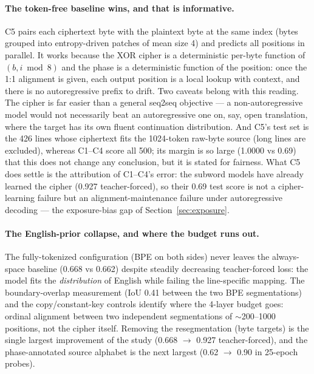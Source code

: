 \documentclass[11pt]{article}
\begin{document}
\paragraph{The token-free baseline wins, and that is informative.}
C5 pairs each ciphertext byte with the plaintext byte at the same index (bytes
grouped into entropy-driven patches of mean size 4) and predicts all positions
in parallel. It works because the XOR cipher is a deterministic per-byte
function of $(b, i \bmod 8)$ and the phase is a deterministic function of the
position: once the 1:1 alignment is given, each output position is a local
lookup with context, and there is no autoregressive prefix to drift. Two caveats belong with this reading. The cipher is far easier
than a general seq2seq objective --- a non-autoregressive model would not
necessarily beat an autoregressive one on, say, open translation, where the
target has its own fluent continuation distribution. And C5's test set is the
426 lines whose ciphertext fits the 1024-token raw-byte source (long lines are
excluded), whereas C1--C4 score all 500; its margin is so large (1.0000 vs
0.69) that this does not change any conclusion, but it is stated for fairness.
What C5 does settle is the attribution of C1--C4's error: the subword models
have already learned the cipher (0.927 teacher-forced), so their 0.69 test score
is not a cipher-learning failure but an alignment-maintenance failure under
autoregressive decoding --- the exposure-bias gap of
Section~\ref{sec:exposure}.

\paragraph{The English-prior collapse, and where the budget runs out.}
The fully-tokenized configuration (BPE on both sides) never leaves the
always-space baseline (0.668 vs 0.662) despite steadily decreasing
teacher-forced loss: the model fits the \emph{distribution} of English while
failing the line-specific mapping. The boundary-overlap measurement
(IoU 0.41 between the two BPE segmentations) and the copy/constant-key controls
identify where the 4-layer budget goes: ordinal alignment between two
independent segmentations of $\sim$200--1000 positions, not the cipher itself.
Removing the resegmentation (byte targets) is the single largest improvement of
the study (0.668 $\to$ 0.927 teacher-forced), and the phase-annotated source
alphabet is the next largest (0.62 $\to$ 0.90 in 25-epoch probes).
\end{document}
